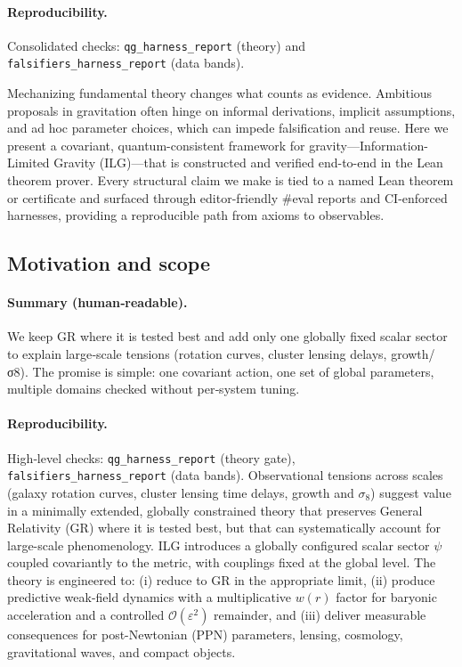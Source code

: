 \documentclass[aps,prd,twocolumn,superscriptaddress,nofootinbib,floatfix,longbibliography]{revtex4-2}
\newcommand{\Order}{\mathcal{O}}
\begin{document}
\paragraph*{Reproducibility.}
Consolidated checks: \texttt{qg\_harness\_report} (theory) and \texttt{falsifiers\_harness\_report} (data bands).

Mechanizing fundamental theory changes what counts as evidence. Ambitious proposals in gravitation often hinge on informal derivations, implicit assumptions, and ad hoc parameter choices, which can impede falsification and reuse. Here we present a covariant, quantum-consistent framework for gravity---Information-Limited Gravity (ILG)---that is constructed and verified end-to-end in the Lean theorem prover. Every structural claim we make is tied to a named Lean theorem or certificate and surfaced through editor-friendly \#eval reports and CI-enforced harnesses, providing a reproducible path from axioms to observables.
%
\subsection{Motivation and scope}
\paragraph*{Summary (human‑readable).}
We keep GR where it is tested best and add only one globally fixed scalar sector to explain large‑scale tensions (rotation curves, cluster lensing delays, growth/σ8). The promise is simple: one covariant action, one set of global parameters, multiple domains checked without per‑system tuning.
\paragraph*{Reproducibility.}
High‑level checks: \texttt{qg\_harness\_report} (theory gate), \texttt{falsifiers\_harness\_report} (data bands).
Observational tensions across scales (galaxy rotation curves, cluster lensing time delays, growth and $\sigma_8$) suggest value in a minimally extended, globally constrained theory that preserves General Relativity (GR) where it is tested best, but that can systematically account for large-scale phenomenology. ILG introduces a globally configured scalar sector $\psi$ coupled covariantly to the metric, with couplings fixed at the global level. The theory is engineered to: (i) reduce to GR in the appropriate limit, (ii) produce predictive weak-field dynamics with a multiplicative $w(r)$ factor for baryonic acceleration and a controlled $\Order(\varepsilon^2)$ remainder, and (iii) deliver measurable consequences for post-Newtonian (PPN) parameters, lensing, cosmology, gravitational waves, and compact objects.
%
\end{document}
